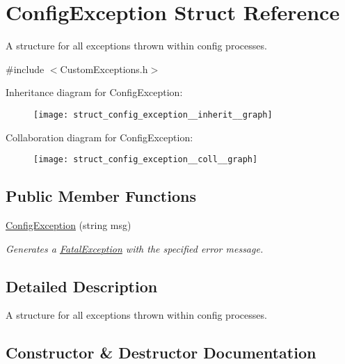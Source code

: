 \hypertarget{struct_config_exception}{}\section{Config\+Exception Struct Reference}
\label{struct_config_exception}


A structure for all exceptions thrown within config processes.  




{\ttfamily \#include $<$Custom\+Exceptions.\+h$>$}



Inheritance diagram for Config\+Exception\+:
\nopagebreak
\begin{figure}[H]
\begin{center}
\leavevmode
\texttt{[image: struct\_config\_exception\_\_inherit\_\_graph]}
\end{center}
\end{figure}


Collaboration diagram for Config\+Exception\+:
\nopagebreak
\begin{figure}[H]
\begin{center}
\leavevmode
\texttt{[image: struct\_config\_exception\_\_coll\_\_graph]}
\end{center}
\end{figure}
\subsection*{Public Member Functions}
\begin{DoxyCompactItemize}
\item 
\hyperlink{struct_config_exception_ab480162a6c4fa7932b4d6906025172f1}{Config\+Exception} (string msg)
\begin{DoxyCompactList}\small\item\em Generates a \hyperlink{struct_fatal_exception}{Fatal\+Exception} with the specified error message. \end{DoxyCompactList}\end{DoxyCompactItemize}


\subsection{Detailed Description}
A structure for all exceptions thrown within config processes. 

\subsection{Constructor \& Destructor Documentation}
